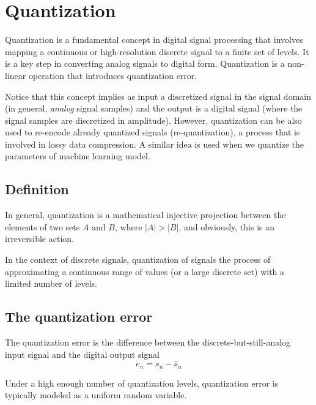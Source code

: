 \chapter{Quantization}

Quantization is a fundamental concept in digital signal processing
that involves mapping a continuous or high-resolution discrete signal
to a finite set of levels. It is a key step in converting analog
signals to digital form. Quantization is a non-linear operation that
introduces quantization error.

Notice that this concept implies as input a discretized signal in the
signal domain (in general, \emph{analog} signal samples) and the
output is a digital signal (where the signal samples are discretized
in amplitude). However, quantization can be also used to re-encode
already quantized signals (re-quantization), a process that is
involved in lossy data compression. A similar idea is used when we
quantize the parameters of machine learning model.

\section{Definition}
In general, quantization is a mathematical injective projection
between the elements of two sets $A$ and $B$, where $|A|>|B|$, and
obviously, this is an irreversible action.

In the context of discrete signals, quantization of signals the process
of approximating a continuous range of values (or a large discrete
set) with a limited number of levels.

\section{The quantization error}

The quantization error is the difference between the
discrete-but-still-analog input signal and the digital output signal
\begin{equation}
  e_n = s_n - \hat{s}_n
\end{equation}

Under a high enough number of quantization levels, quantization error
is typically modeled as a uniform random variable.
